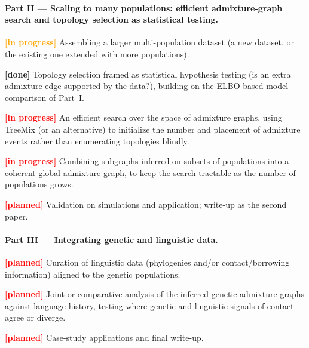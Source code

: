 \documentclass[12pt]{article}
\theoremstyle{definition}
\theoremstyle{definition}
\theoremstyle{lemma}
\theoremstyle{remark}
\theoremstyle{definition}
\begin{document}
\paragraph{Part II --- Scaling to many populations: efficient admixture-graph
search and topology selection as statistical testing.}
\begin{compactitem}
  \item \textcolor{orange}{\textbf{[in progress]}} Assembling a larger
  multi-population dataset (a new dataset, or the existing one extended with more
  populations).
  
  \item \textcolor{codegreen}{\textbf{[done]}} Topology selection framed as
  statistical hypothesis testing (is an extra admixture edge supported by the
  data?), building on the ELBO-based model comparison of Part~I.
  \item \textcolor{red}{\textbf{[in progress]}} An efficient search over the space of
  admixture graphs, using TreeMix (or an alternative) to initialize the number
  and placement of admixture events rather than enumerating topologies blindly.
  \item \textcolor{red}{\textbf{[in progress]}} Combining subgraphs inferred on
  subsets of populations into a coherent global admixture graph, to keep the
  search tractable as the number of populations grows.
  \item \textcolor{red}{\textbf{[planned]}} Validation on simulations and
  application; write-up as the second paper.
\end{compactitem}

\paragraph{Part III --- Integrating genetic and linguistic data.}
\begin{compactitem}
  \item \textcolor{red}{\textbf{[planned]}} Curation of linguistic data
  (phylogenies and/or contact/borrowing information) aligned to the genetic
  populations.
  \item \textcolor{red}{\textbf{[planned]}} Joint or comparative analysis of the
  inferred genetic admixture graphs against language history, testing where
  genetic and linguistic signals of contact agree or diverge.
  \item \textcolor{red}{\textbf{[planned]}} Case-study applications and final
  write-up.
\end{compactitem}
\end{document}

